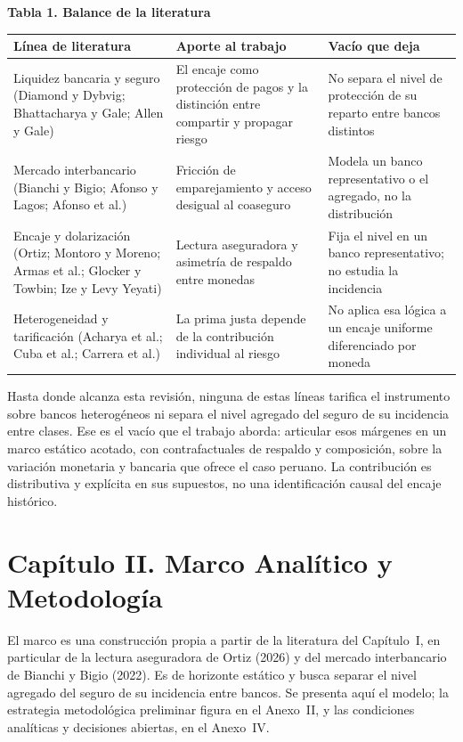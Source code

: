 \documentclass[11pt,a4paper]{article}
\begin{document}
\renewcommand{\arraystretch}{1.3}
\begin{center}\footnotesize\textbf{Tabla 1. Balance de la literatura}\end{center}
\noindent\begin{tabular}{@{}p{3.0cm}p{5.4cm}p{5.4cm}@{}}
\toprule
\textbf{Línea de literatura} & \textbf{Aporte al trabajo} & \textbf{Vacío que deja}\\
\midrule
Liquidez bancaria y seguro (Diamond y Dybvig; Bhattacharya y Gale; Allen y Gale) & El encaje como protección de pagos y la distinción entre compartir y propagar riesgo & No separa el nivel de protección de su reparto entre bancos distintos\\
Mercado interbancario (Bianchi y Bigio; Afonso y Lagos; Afonso et al.) & Fricción de emparejamiento y acceso desigual al coaseguro & Modela un banco representativo o el agregado, no la distribución\\
Encaje y dolarización (Ortiz; Montoro y Moreno; Armas et al.; Glocker y Towbin; Ize y Levy Yeyati) & Lectura aseguradora y asimetría de respaldo entre monedas & Fija el nivel en un banco representativo; no estudia la incidencia\\
Heterogeneidad y tarificación (Acharya et al.; Cuba et al.; Carrera et al.) & La prima justa depende de la contribución individual al riesgo & No aplica esa lógica a un encaje uniforme diferenciado por moneda\\
\bottomrule
\end{tabular}

\medskip
\noindent Hasta donde alcanza esta revisión, ninguna de estas líneas tarifica el instrumento sobre bancos heterogéneos ni separa el nivel agregado del seguro de su incidencia entre clases. Ese es el vacío que el trabajo aborda: articular esos márgenes en un marco estático acotado, con contrafactuales de respaldo y composición, sobre la variación monetaria y bancaria que ofrece el caso peruano. La contribución es distributiva y explícita en sus supuestos, no una identificación causal del encaje histórico.

\clearpage
\section{Capítulo II. Marco Analítico y Metodología}\label{sec:marco}

El marco es una construcción propia a partir de la literatura del Capítulo~I, en particular de la lectura aseguradora de Ortiz (2026) y del mercado interbancario de Bianchi y Bigio (2022). Es de horizonte estático y busca separar el nivel agregado del seguro de su incidencia entre bancos. Se presenta aquí el modelo; la estrategia metodológica preliminar figura en el Anexo~II, y las condiciones analíticas y decisiones abiertas, en el Anexo~IV.
\end{document}
